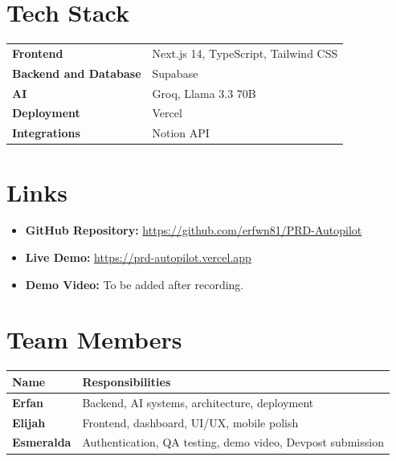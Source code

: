 \documentclass[11pt]{article}
\begin{document}
\section{Tech Stack}

\begin{tcolorbox}[
    colback=light,
    colframe=primary,
    arc=3mm,
    boxrule=0.8pt
]
\begin{tabular}{>{\bfseries}p{4cm} p{10cm}}
Frontend & Next.js 14, TypeScript, Tailwind CSS \\
Backend and Database & Supabase \\
AI & Groq, Llama 3.3 70B \\
Deployment & Vercel \\
Integrations & Notion API \\
\end{tabular}
\end{tcolorbox}

\section{Links}

\begin{itemize}
    \item \textbf{GitHub Repository:} \href{https://github.com/erfwn81/PRD-Autopilot}{https://github.com/erfwn81/PRD-Autopilot}
    \item \textbf{Live Demo:} \href{https://prd-autopilot.vercel.app}{https://prd-autopilot.vercel.app}
    \item \textbf{Demo Video:} To be added after recording.
\end{itemize}

\section{Team Members}

\begin{center}
\begin{tabular}{|>{\bfseries}p{3cm}|p{10cm}|}
\hline
Name & Responsibilities \\
\hline
Erfan & Backend, AI systems, architecture, deployment \\
\hline
Elijah & Frontend, dashboard, UI/UX, mobile polish \\
\hline
Esmeralda & Authentication, QA testing, demo video, Devpost submission \\
\hline
\end{tabular}
\end{center}
\end{document}
